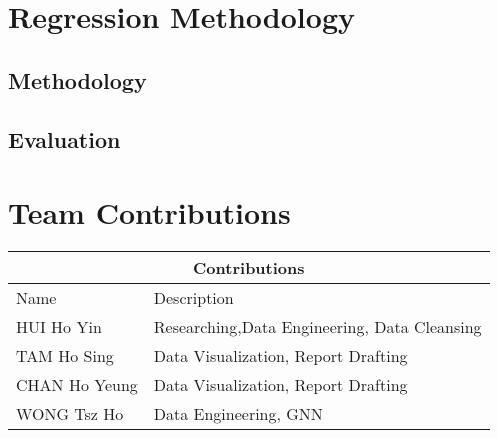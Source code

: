 \section{Regression Methodology}
\subsection{Methodology}


\subsection{Evaluation}




\section{Team Contributions}
\begin{tabular}{ |p{2.5cm}||p{4cm}|  }
 \hline
 \multicolumn{2}{|c|}{Contributions} \\
 \hline
 Name    & Description\\
 \hline
 HUI Ho Yin & Researching,Data Engineering, Data Cleansing\\
 \hline
 TAM Ho Sing & Data Visualization, Report Drafting \\
 \hline
 CHAN Ho Yeung &  Data Visualization, Report Drafting\\
 \hline
 WONG Tsz Ho & Data Engineering, GNN \\
 \hline
\end{tabular}\\






